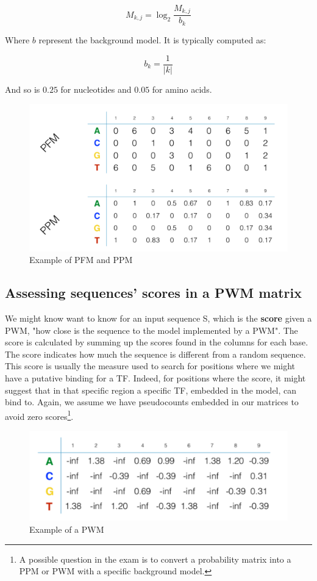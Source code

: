 			$$M_{k,j} = \log_2\frac{M_{k,j}}{b_k}$$
			
			 
			Where $b$ represent the background model.
			It is typically computed as:

			$$b_k = \frac{1}{|k|}$$

			And so is $0.25$ for nucleotides and $0.05$ for amino acids.
			
			
			\begin{figure}
			\centering
			\includegraphics[scale=0.3]{matrices.png}
			\caption{Example of PFM and PPM}
			\label{fig:matrices}
			\end{figure}
			
		\subsection{Assessing sequences' scores in a PWM matrix}
		We might know want to know for an input sequence S, which is the \textbf{score} given a PWM, "how close is the sequence to the model implemented by a PWM". 
		The score is calculated by summing up the scores found in the columns for each base. 
		The score indicates how much the sequence is different from a random sequence. 
		This score is usually the measure used to search for positions where we might have a putative binding for a TF. 
		Indeed, for positions where the score, it might suggest that in that specific region a specific TF, embedded in the model, can bind to.
		Again, we assume we have pseudocounts embedded in our matrices to avoid zero scores\footnote{A possible question in the exam is to convert a probability matrix into a PPM or PWM with a specific background model.}. 
			
			\begin{figure}
			\centering
			\includegraphics[scale=0.3]{pwm.png}
			\caption{Example of a PWM}
			\label{fig:pwm}
			\end{figure}
			

